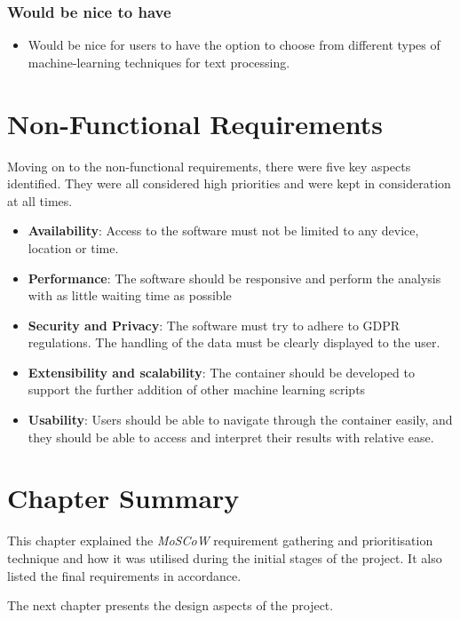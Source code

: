 \documentclass{l4proj}
\begin{document}
\subsubsection{Would be nice to have}
\begin{itemize}
\item
Would be nice for users to have the option to choose from different types of machine-learning techniques for text processing.
\end{itemize}
\section{Non-Functional Requirements}
Moving on to the non-functional requirements, there were five key aspects identified. They were all considered high priorities and were kept in consideration at all times.
\begin{itemize}
    \item \textbf{Availability}: Access to the software must not be limited to any device, location or time.
    \item \textbf{Performance}: The software should be responsive and perform the analysis with as little waiting time as possible
    \item \textbf{Security and Privacy}: The software must try to adhere to GDPR regulations. The handling of the data must be clearly displayed to the user.
    \item \textbf{Extensibility and scalability}: The container should be developed to support the further addition of other machine learning scripts
    \item \textbf{Usability}: Users should be able to navigate through the container easily, and they should be able to access and interpret their results with relative ease. 
\end{itemize}

\section{Chapter Summary}
This chapter explained the \textit{MoSCoW} requirement gathering and prioritisation technique and how it was utilised during the initial stages of the project. It also listed the final requirements in accordance. 

The next chapter presents the design aspects of the project.

\end{document}
